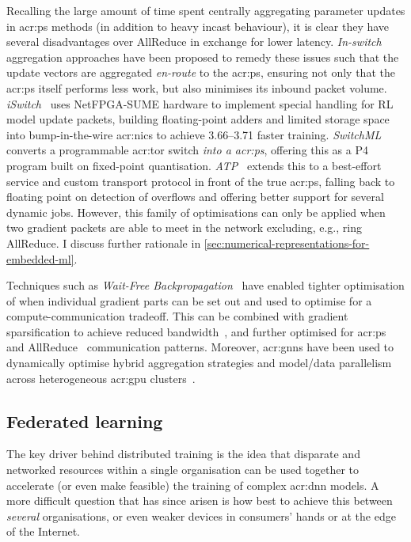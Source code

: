 Recalling the large amount of time spent centrally aggregating parameter updates in \gls{acr:ps} methods (in addition to heavy incast behaviour), it is clear they have several disadvantages over AllReduce in exchange for lower latency.
\emph{In-switch} aggregation approaches have been proposed to remedy these issues such that the update vectors are aggregated \emph{en-route} to the \gls{acr:ps}, ensuring not only that the \gls{acr:ps} itself performs less work, but also minimises its inbound packet volume.
\emph{iSwitch}~\parencite{DBLP:conf/isca/LiLYCSH19} uses NetFPGA-SUME hardware to implement special handling for RL model update packets, building floating-point adders and limited storage space into bump-in-the-wire \glspl{acr:nic} to achieve \qtyrange{3.66}{3.71}{\times} faster training.
\emph{SwitchML}~\parencite{DBLP:conf/nsdi/SapioC0NKKKMPR21} converts a programmable \gls{acr:tor} switch \emph{into a \gls{acr:ps}}, offering this as a P4 program built on fixed-point quantisation.
\emph{ATP}~\parencite{DBLP:conf/nsdi/LaoLMCWAS21} extends this to a best-effort service and custom transport protocol in front of the true \gls{acr:ps}, falling back to floating point on detection of overflows and offering better support for several dynamic jobs.
However, this family of optimisations can only be applied when two gradient packets are able to meet in the network excluding, e.g., ring AllReduce.
I discuss further rationale in \cref{sec:numerical-representations-for-embedded-ml}.

Techniques such as \emph{Wait-Free Backpropagation}~\parencite{DBLP:conf/usenix/ZhangZXDHLHWXX17,DBLP:conf/ppopp/AwanHHP17} have enabled tighter optimisation of when individual gradient parts can be set out and used to optimise for a compute-communication tradeoff.
This can be combined with gradient sparsification to achieve reduced bandwidth~\parencite{DBLP:conf/infocom/ShiWCLQLZ20}, and further optimised for \gls{acr:ps}~\parencite{DBLP:conf/infocom/WangLG20} and AllReduce~\parencite{DBLP:conf/infocom/BaoPCW20} communication patterns.
Moreover, \glspl{acr:gnn} have been used to dynamically optimise hybrid aggregation strategies and model/data parallelism across heterogeneous \gls{acr:gpu} clusters~\parencite{DBLP:conf/conext/0001ZLLDWZYL20}.

\subsection{Federated learning}
The key driver behind distributed training is the idea that disparate and networked resources within a single organisation can be used together to accelerate (or even make feasible) the training of complex \gls{acr:dnn} models.
A more difficult question that has since arisen is how best to achieve this between \emph{several} organisations, or even weaker devices in consumers' hands or at the edge of the Internet.

